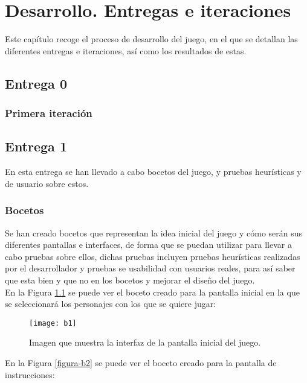 \chapter{Desarrollo. Entregas e iteraciones}
\label{ch:desarrollo}
Este capítulo recoge el proceso de desarrollo del juego, en el que se detallan las diferentes entregas e iteraciones, así como los resultados de estas.

\section{Entrega 0}

\subsection{Primera iteración}

\section{Entrega 1}
En esta entrega se han llevado a cabo bocetos del juego, y pruebas heurísticas y de usuario sobre estos.

\subsection{Bocetos}
Se han creado bocetos que representan la idea inicial del juego y cómo serán sus diferentes pantallas e interfaces, de forma que se puedan utilizar para llevar a cabo pruebas sobre ellos, dichas pruebas incluyen pruebas heurísticas realizadas por el desarrollador y pruebas se usabilidad con usuarios reales, para así saber que esta bien y que no en los bocetos y mejorar el diseño del juego.\\

En la Figura \ref{figura-b1} se puede ver el boceto creado para la pantalla inicial en la que se seleccionará los personajes con los que se quiere jugar:

\begin{figure}[h]
  \centering
  \texttt{[image: b1]}
  \caption{Imagen que muestra la interfaz de la pantalla inicial del juego.\protect\footnotemark}
  \label{figura-b1}
\end{figure}

\newpage

En la Figura \ref{figura-b2} se puede ver el boceto creado para la pantalla de instrucciones:


